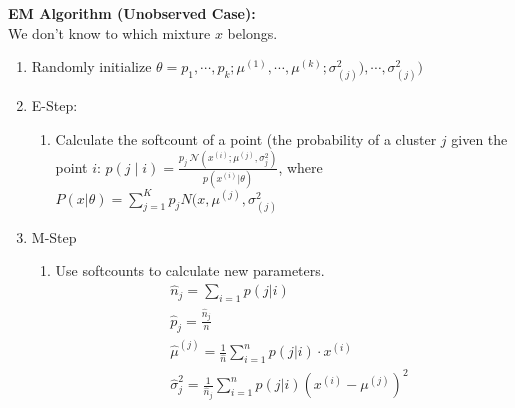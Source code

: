 \textbf{EM Algorithm (Unobserved Case):}\\
We don't know to which mixture $x$ belongs.\\

\begin{enumerate}
\item Randomly initialize $\theta={p_1,\cdots,p_k;\mu^{(1)},\cdots,\mu^{(k)};\sigma^2_{(j)}),\cdots,\sigma^2_{(j)})}$
\item E-Step:
	\begin{enumerate}
		\item Calculate the softcount of a point (the probability of a cluster $j$ given the point $i$: $\displaystyle  p(j \mid i) = \frac{p_ j ~  \mathcal{N}(x^{(i)} ; \mu ^{(j)}, \sigma _ j^2)}{p(x^{(i)} | \theta )}$, where $P(x|\theta)=\sum_{j=1}^K p_j N(x,\mu^{(j)},\sigma^2_{(j)}$
	\end{enumerate}
\item M-Step
	\begin{enumerate}
		\item  Use softcounts to calculate new parameters.
		\begin{align*}
		&\hat{n}_j = \sum_{i=1} p(j|i)\\
		&\hat{p}_j= \frac{\hat{n}_j}{n}\\
		&\hat{\mu}^{(j)}= \frac{1}{\hat{n}} \sum
_{i=1}^n p(j|i) \cdot x^{(i)}\\
		&\hat{\sigma}^2_j=\frac{1}{\hat{n}_j}\sum_{i=1}^n p(j|i) (x^{(i)} - \mu^{(j)})^2
		\end{align*}
	\end{enumerate}
\end{enumerate}